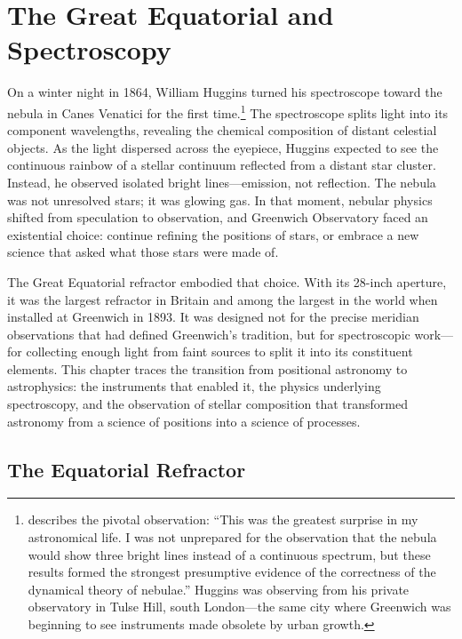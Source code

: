 \chapter{The Great Equatorial and Spectroscopy}
\label{ch:great-equatorial}

On a winter night in 1864, William Huggins turned his spectroscope toward the nebula in Canes Venatici for the first time.\footnote{\textcite{Huggins1864} describes the pivotal observation: ``This was the greatest surprise in my astronomical life. I was not unprepared for the observation that the nebula would show three bright lines instead of a continuous spectrum, but these results formed the strongest presumptive evidence of the correctness of the dynamical theory of nebulae.'' Huggins was observing from his private observatory in Tulse Hill, south London—the same city where Greenwich was beginning to see instruments made obsolete by urban growth.} The spectroscope splits light into its component wavelengths, revealing the chemical composition of distant celestial objects. As the light dispersed across the eyepiece, Huggins expected to see the continuous rainbow of a stellar continuum reflected from a distant star cluster. Instead, he observed isolated bright lines—emission, not reflection. The nebula was not unresolved stars; it was glowing gas. In that moment, nebular physics shifted from speculation to observation, and Greenwich Observatory faced an existential choice: continue refining the positions of stars, or embrace a new science that asked what those stars were made of.

The Great Equatorial refractor embodied that choice. With its 28-inch aperture, it was the largest refractor in Britain and among the largest in the world when installed at Greenwich in 1893. It was designed not for the precise meridian observations that had defined Greenwich's tradition, but for spectroscopic work---for collecting enough light from faint sources to split it into its constituent elements. This chapter traces the transition from positional astronomy to astrophysics: the instruments that enabled it, the physics underlying spectroscopy, and the observation of stellar composition that transformed astronomy from a science of positions into a science of processes.

\section{The Equatorial Refractor}

